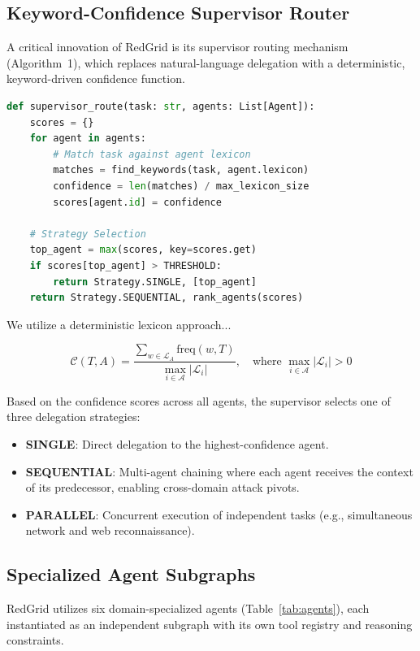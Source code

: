 \documentclass[conference,compsoc]{IEEEtran}
\begin{document}
\subsection{Keyword-Confidence Supervisor Router}
A critical innovation of RedGrid is its supervisor routing mechanism (Algorithm~1), which replaces natural-language delegation with a deterministic, keyword-driven confidence function. 

\begin{lstlisting}[language=Python, caption={RedGrid Supervisor Routing Logic}, label={alg:router}]
def supervisor_route(task: str, agents: List[Agent]):
    scores = {}
    for agent in agents:
        # Match task against agent lexicon
        matches = find_keywords(task, agent.lexicon)
        confidence = len(matches) / max_lexicon_size
        scores[agent.id] = confidence
    
    # Strategy Selection
    top_agent = max(scores, key=scores.get)
    if scores[top_agent] > THRESHOLD:
        return Strategy.SINGLE, [top_agent]
    return Strategy.SEQUENTIAL, rank_agents(scores)
\end{lstlisting}

We utilize a deterministic lexicon approach...

\begin{equation} \label{eq:confidence}
\mathcal{C}(T, A) = \frac{\sum_{w \in \mathcal{L}_A} \text{freq}(w, T)}{\max_{i \in \mathcal{A}} |\mathcal{L}_i|}, \quad \text{where } \max_{i \in \mathcal{A}} |\mathcal{L}_i| > 0
\end{equation}

Based on the confidence scores across all agents, the supervisor selects one of three delegation strategies:
\begin{itemize}
    \item \textbf{SINGLE}: Direct delegation to the highest-confidence agent.
    \item \textbf{SEQUENTIAL}: Multi-agent chaining where each agent receives the context of its predecessor, enabling cross-domain attack pivots.
    \item \textbf{PARALLEL}: Concurrent execution of independent tasks (e.g., simultaneous network and web reconnaissance).
\end{itemize}

\subsection{Specialized Agent Subgraphs}
RedGrid utilizes six domain-specialized agents (Table~\ref{tab:agents}), each instantiated as an independent subgraph with its own tool registry and reasoning constraints. 
\end{document}
